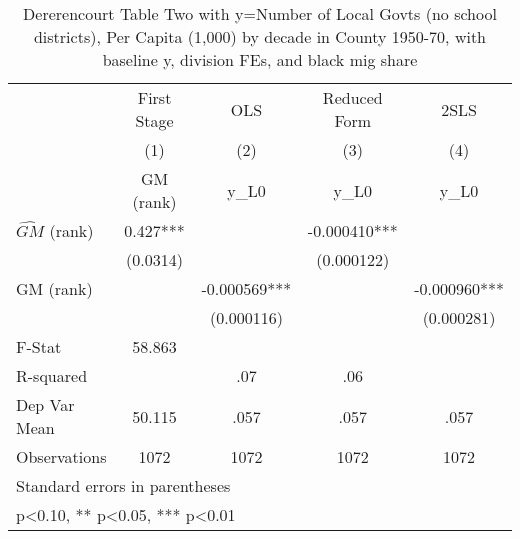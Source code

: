 \begin{table}[htbp]\centering
\def\sym#1{\ifmmode^{#1}\else\(^{#1}\)\fi}
\caption{Dererencourt Table Two with y=Number of Local Govts (no school districts), Per Capita (1,000) by decade in County 1950-70, with baseline y, division FEs, and black mig share}
\begin{tabular}{l*{4}{c}}
\toprule
                    & First Stage   &         OLS   &Reduced Form   &        2SLS   \\
                    &\multicolumn{1}{c}{(1)}&\multicolumn{1}{c}{(2)}&\multicolumn{1}{c}{(3)}&\multicolumn{1}{c}{(4)}\\
                    &\multicolumn{1}{c}{GM  (rank)}&\multicolumn{1}{c}{y\_L0}&\multicolumn{1}{c}{y\_L0}&\multicolumn{1}{c}{y\_L0}\\
\midrule
$\hat{GM}$ (rank)   &       0.427***&               &   -0.000410***&               \\
                    &    (0.0314)   &               &  (0.000122)   &               \\
\addlinespace
GM  (rank)          &               &   -0.000569***&               &   -0.000960***\\
                    &               &  (0.000116)   &               &  (0.000281)   \\
\midrule
F-Stat              &      58.863   &               &               &               \\
R-squared           &               &         .07   &         .06   &               \\
Dep Var Mean        &      50.115   &        .057   &        .057   &        .057   \\
Observations        &        1072   &        1072   &        1072   &        1072   \\
\bottomrule
\multicolumn{5}{l}{\footnotesize Standard errors in parentheses}\\
\multicolumn{5}{l}{\footnotesize * p<0.10, ** p<0.05, *** p<0.01}\\
\end{tabular}
\end{table}
